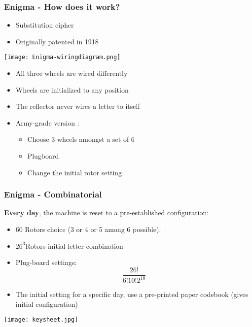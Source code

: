 \documentclass[
hyperref={pdfpagelabels=false}
,xcolor=table
]
{beamer}
\begin{document}
\begin{frame}
  \frametitle{Enigma - How does it work?}

  \begin{itemize}
  \item Substitution cipher
  \item Originally patented in 1918
  \end{itemize}

  \begin{center}
    \texttt{[image: Enigma-wiringdiagram.png]}
  \end{center}

  

  
  \begin{itemize}
  \item All three wheels are wired differently 
  \item Wheels are initialized to any position
  \item The reflector never wires a letter to itself
  \item Army-grade version :
    \begin{itemize}
    \item Choose 3 wheels amongst a set of 6
    \item Plugboard
    \item Change the initial rotor setting
    \end{itemize}
  \end{itemize}
  
\end{frame}


\begin{frame}
  \frametitle{Enigma - Combinatorial}
  \textbf{Every day}, the machine is reset to a pre-established configuration:
  \begin{itemize}
  \item $60$ Rotors choice (3 or 4 or 5 among 6 possible). 
  \item  $26^3$Rotors initial letter combination
  \item Plug-board settings: $$\frac{26!}{6!10!2^{10}}$$
  \item The initial setting for a specific day, use a pre-printed
    paper codebook (gives initial configuration)
  \end{itemize}

  \begin{center}
    \texttt{[image: keysheet.jpg]}
  \end{center}
  
\end{frame}
\end{document}

